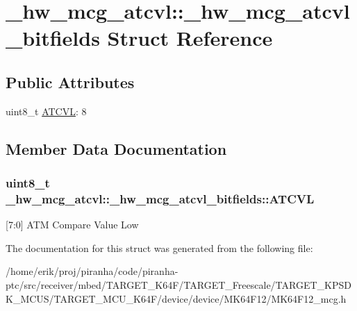 \hypertarget{struct__hw__mcg__atcvl_1_1__hw__mcg__atcvl__bitfields}{}\section{\+\_\+hw\+\_\+mcg\+\_\+atcvl\+:\+:\+\_\+hw\+\_\+mcg\+\_\+atcvl\+\_\+bitfields Struct Reference}
\label{struct__hw__mcg__atcvl_1_1__hw__mcg__atcvl__bitfields}
\subsection*{Public Attributes}
\begin{DoxyCompactItemize}
\item 
uint8\+\_\+t \hyperlink{struct__hw__mcg__atcvl_1_1__hw__mcg__atcvl__bitfields_a84736365b1696af82df0c3b196652b85}{A\+T\+C\+VL}\+: 8
\end{DoxyCompactItemize}


\subsection{Member Data Documentation}
\subsubsection[{\texorpdfstring{A\+T\+C\+VL}{ATCVL}}]{\setlength{\rightskip}{0pt plus 5cm}uint8\+\_\+t \+\_\+hw\+\_\+mcg\+\_\+atcvl\+::\+\_\+hw\+\_\+mcg\+\_\+atcvl\+\_\+bitfields\+::\+A\+T\+C\+VL}\hypertarget{struct__hw__mcg__atcvl_1_1__hw__mcg__atcvl__bitfields_a84736365b1696af82df0c3b196652b85}{}\label{struct__hw__mcg__atcvl_1_1__hw__mcg__atcvl__bitfields_a84736365b1696af82df0c3b196652b85}
\mbox{[}7\+:0\mbox{]} A\+TM Compare Value Low 

The documentation for this struct was generated from the following file\+:\begin{DoxyCompactItemize}
\item 
/home/erik/proj/piranha/code/piranha-\/ptc/src/receiver/mbed/\+T\+A\+R\+G\+E\+T\+\_\+\+K64\+F/\+T\+A\+R\+G\+E\+T\+\_\+\+Freescale/\+T\+A\+R\+G\+E\+T\+\_\+\+K\+P\+S\+D\+K\+\_\+\+M\+C\+U\+S/\+T\+A\+R\+G\+E\+T\+\_\+\+M\+C\+U\+\_\+\+K64\+F/device/device/\+M\+K64\+F12/M\+K64\+F12\+\_\+mcg.\+h\end{DoxyCompactItemize}
